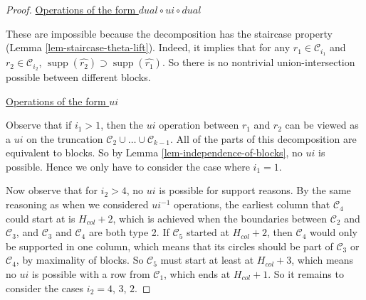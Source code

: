 \documentclass[11pt,letterpaper]{amsart}
\newcommand{\inv}{^{-1}}
\newcommand{\CC}{\mathcal{C}}
\DeclareMathOperator{\supp}{supp}
\numberwithin{equation}{section}
\begin{document}
\begin{proof}
    \underline{Operations of the form $dual \circ ui \circ dual$}

   These are impossible because the decomposition has the staircase property (Lemma \ref{lem-staircase-theta-lift}). Indeed, it implies that for any $r_1 \in \CC_{i_1}$ and $r_2 \in \CC_{i_2}$, $\supp(\widehat{r_2}) \supset \supp(\widehat{r_1})$. So there is no nontrivial union-intersection possible between different blocks.

    \underline{Operations of the form $ui$}

    Observe that if $i_1 > 1$, then the $ui$ operation between $r_1$ and $r_2$ can be viewed as a $ui$ on the truncation $\CC_2 \cup \dots \cup \CC_{k-1}$. All of the parts of this decomposition are equivalent to blocks. So by Lemma \ref{lem-independence-of-blocks}, no $ui$ is possible. Hence we only have to consider the case where $i_1 = 1$.

    Now observe that for $i_2 > 4$, no $ui$ is possible for support reasons. By the same reasoning as when we considered $ui\inv$ operations, the earliest column that $\CC_4$ could start at is $H_{col}+2$, which is achieved when the boundaries between $\CC_2$ and $\CC_3$, and $\CC_3$ and $\CC_4$ are both type 2. If $\CC_5$ started at $H_{col}+2$, then $\CC_4$ would only be supported in one column, which means that its circles should be part of $\CC_3$ or $\CC_4$, by maximality of blocks. So $\CC_5$ must start at least at $H_{col}+3$, which means no $ui$ is possible with a row from $\CC_1$, which ends at $H_{col}+1$. So it remains to consider the cases $i_2 = 4$, $3$, $2$.


\end{proof}
\end{document}
